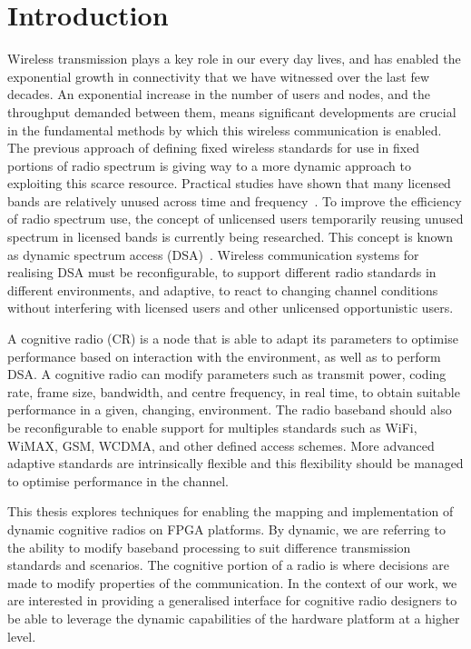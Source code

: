 \chapter{Introduction}
\label{chap:introduction}

Wireless transmission plays a key role in our every day lives, and has enabled the exponential growth in connectivity that we have witnessed over the last few decades.
An exponential increase in the number of users and nodes, and the throughput demanded between them, means significant developments are crucial in the fundamental methods by which this wireless communication is enabled.
The previous approach of defining fixed wireless standards for use in fixed portions of radio spectrum is giving way to a more dynamic approach to exploiting this scarce resource.
Practical studies have shown that many licensed bands are relatively unused across time and frequency~\cite{FCC2002}.
To improve the efficiency of radio spectrum use, the concept of unlicensed users temporarily reusing unused spectrum in licensed bands is currently being researched.
This concept is known as dynamic spectrum access (DSA)~\cite{Minden}.
Wireless communication systems for realising DSA must be reconfigurable, to support different radio standards in different environments, and adaptive, to react to changing channel conditions without interfering with licensed users and other unlicensed opportunistic users.

A cognitive radio (CR) is a node that is able to adapt its parameters to optimise performance based on interaction with the environment, as well as to perform DSA.
A cognitive radio can modify parameters such as transmit power, coding rate, frame size, bandwidth, and centre frequency, in real time, to obtain suitable performance in a given, changing, environment.
The radio baseband should also be reconfigurable to enable support for multiples standards such as WiFi, WiMAX, GSM, WCDMA, and other defined access schemes.
More advanced adaptive standards are intrinsically flexible and this flexibility should be managed to optimise performance in the channel.

This thesis explores techniques for enabling the mapping and implementation of dynamic cognitive radios on FPGA platforms.
By dynamic, we are referring to the ability to modify baseband processing to suit difference transmission standards and scenarios.
The cognitive portion of a radio is where decisions are made to modify properties of the communication.
In the context of our work, we are interested in providing a generalised interface for cognitive radio designers to be able to leverage the dynamic capabilities of the hardware platform at a higher level.

